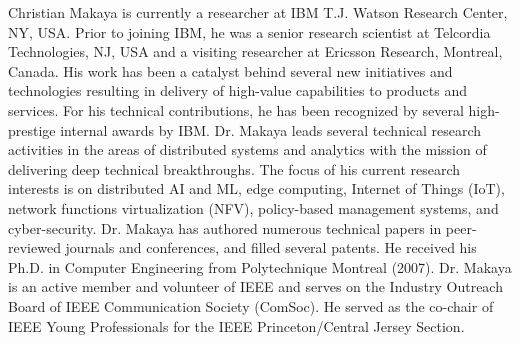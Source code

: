 \documentclass[10pt,journal,compsoc]{IEEEtran}
\begin{document}
\begin{IEEEbiography}
{Christian Makaya}
is currently a researcher at IBM T.J. Watson Research Center, NY, USA. Prior to joining IBM, he was a senior research scientist at Telcordia Technologies, NJ, USA and a visiting researcher at Ericsson Research, Montreal, Canada. His work has been a catalyst behind several new initiatives and technologies resulting in delivery of high-value capabilities to products and services. For his technical contributions, he has been recognized by several high-prestige internal awards by IBM. Dr. Makaya leads several technical research activities in the areas of distributed systems and analytics with the mission of delivering deep technical breakthroughs. The focus of his current research interests is on distributed AI and ML, edge computing, Internet of Things (IoT), network functions virtualization (NFV), policy-based management systems, and cyber-security. Dr. Makaya has authored numerous technical papers in peer-reviewed journals and conferences, and filled several patents. He received his Ph.D. in Computer Engineering from Polytechnique Montreal (2007). Dr. Makaya is an active member and volunteer of IEEE and serves on the Industry Outreach Board of IEEE Communication Society (ComSoc). He served as the co-chair of IEEE Young Professionals for the IEEE Princeton/Central Jersey Section.
\end{IEEEbiography}










\end{document}
